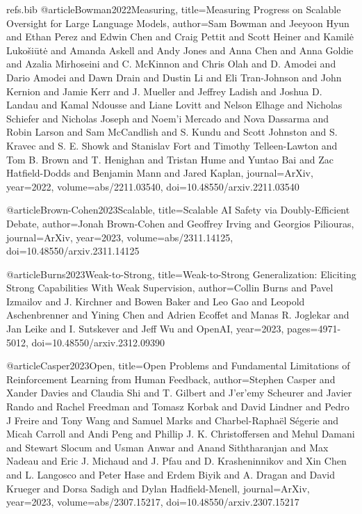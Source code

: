 \begin{filecontents}{refs.bib}
@article{Bowman2022Measuring,
title={Measuring Progress on Scalable Oversight for Large Language Models},
author={Sam Bowman and Jeeyoon Hyun and Ethan Perez and Edwin Chen and Craig Pettit and Scott Heiner and Kamilė Lukošiūtė and Amanda Askell and Andy Jones and Anna Chen and Anna Goldie and Azalia Mirhoseini and C. McKinnon and Chris Olah and D. Amodei and Dario Amodei and Dawn Drain and Dustin Li and Eli Tran-Johnson and John Kernion and Jamie Kerr and J. Mueller and Jeffrey Ladish and Joshua D. Landau and Kamal Ndousse and Liane Lovitt and Nelson Elhage and Nicholas Schiefer and Nicholas Joseph and Noem'i Mercado and Nova Dassarma and Robin Larson and Sam McCandlish and S. Kundu and Scott Johnston and S. Kravec and S. E. Showk and Stanislav Fort and Timothy Telleen-Lawton and Tom B. Brown and T. Henighan and Tristan Hume and Yuntao Bai and Zac Hatfield-Dodds and Benjamin Mann and Jared Kaplan},
journal={ArXiv},
year={2022},
volume={abs/2211.03540},
doi={10.48550/arxiv.2211.03540}
}

@article{Brown-Cohen2023Scalable,
title={Scalable AI Safety via Doubly-Efficient Debate},
author={Jonah Brown-Cohen and Geoffrey Irving and Georgios Piliouras},
journal={ArXiv},
year={2023},
volume={abs/2311.14125},
doi={10.48550/arxiv.2311.14125}
}

@article{Burns2023Weak-to-Strong,
title={Weak-to-Strong Generalization: Eliciting Strong Capabilities With Weak Supervision},
author={Collin Burns and Pavel Izmailov and J. Kirchner and Bowen Baker and Leo Gao and Leopold Aschenbrenner and Yining Chen and Adrien Ecoffet and Manas R. Joglekar and Jan Leike and I. Sutskever and Jeff Wu and OpenAI},
year={2023},
pages={4971-5012},
doi={10.48550/arxiv.2312.09390}
}

@article{Casper2023Open,
title={Open Problems and Fundamental Limitations of Reinforcement Learning from Human Feedback},
author={Stephen Casper and Xander Davies and Claudia Shi and T. Gilbert and J'er'emy Scheurer and Javier Rando and Rachel Freedman and Tomasz Korbak and David Lindner and Pedro J Freire and Tony Wang and Samuel Marks and Charbel-Raphaël Ségerie and Micah Carroll and Andi Peng and Phillip J. K. Christoffersen and Mehul Damani and Stewart Slocum and Usman Anwar and Anand Siththaranjan and Max Nadeau and Eric J. Michaud and J. Pfau and D. Krasheninnikov and Xin Chen and L. Langosco and Peter Hase and Erdem Biyik and A. Dragan and David Krueger and Dorsa Sadigh and Dylan Hadfield-Menell},
journal={ArXiv},
year={2023},
volume={abs/2307.15217},
doi={10.48550/arxiv.2307.15217}
}


\end{filecontents}
